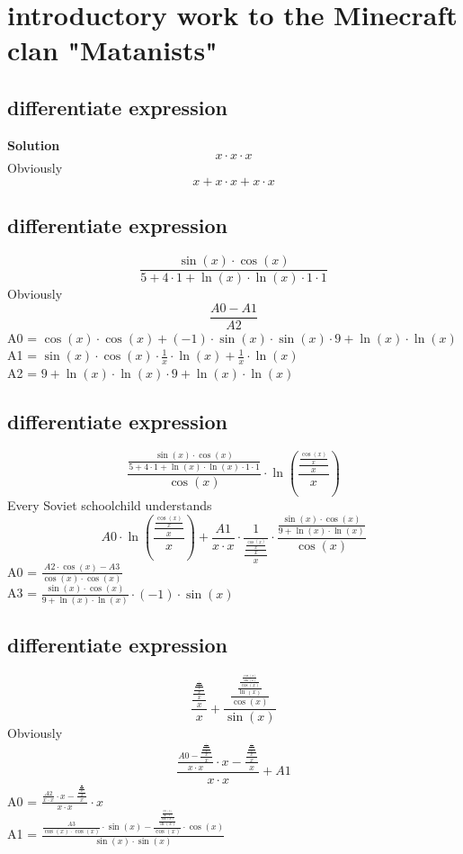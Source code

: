 \documentclass[12pt]{article}
\begin{document}
\section{introductory work to the Minecraft clan "Matanists"}
\subsection{differentiate expression}
\textbf{Solution}
$$x \cdot x \cdot x$$ 
Obviously \\ 
$$x + x \cdot x + x \cdot x$$ 
\subsection{differentiate expression}
$$\frac{\sin(x) \cdot \cos(x)}{5 + 4 \cdot 1 + \ln(x) \cdot \ln(x) \cdot 1 \cdot 1}$$ 
Obviously \\ 
$$\frac{A0 - A1}{A2}$$ 
A0 = $\cos(x) \cdot \cos(x) + (-1) \cdot \sin(x) \cdot \sin(x) \cdot 9 + \ln(x) \cdot \ln(x)$ \\ 
A1 = $\sin(x) \cdot \cos(x) \cdot \frac{1}{x} \cdot \ln(x) + \frac{1}{x} \cdot \ln(x)$ \\ 
A2 = $9 + \ln(x) \cdot \ln(x) \cdot 9 + \ln(x) \cdot \ln(x)$ \\ 
\subsection{differentiate expression}
$$\frac{\frac{\sin(x) \cdot \cos(x)}{5 + 4 \cdot 1 + \ln(x) \cdot \ln(x) \cdot 1 \cdot 1}}{\cos(x)} \cdot \ln(\frac{\frac{\frac{\cos(x)}{x}}{x}}{x})$$ 
Every Soviet schoolchild understands \\ 
$$A0 \cdot \ln(\frac{\frac{\frac{\cos(x)}{x}}{x}}{x}) + \frac{A1}{x \cdot x} \cdot \frac{1}{\frac{\frac{\frac{\cos(x)}{x}}{x}}{x}} \cdot \frac{\frac{\sin(x) \cdot \cos(x)}{9 + \ln(x) \cdot \ln(x)}}{\cos(x)}$$ 
A0 = $\frac{A2 \cdot \cos(x) - A3}{\cos(x) \cdot \cos(x)}$ \\ 
A3 = $\frac{\sin(x) \cdot \cos(x)}{9 + \ln(x) \cdot \ln(x)} \cdot (-1) \cdot \sin(x)$ \\ 
\subsection{differentiate expression}
$$\frac{\frac{\frac{\frac{\frac{\frac{\frac{\frac{\frac{x}{x}}{x}}{x}}{x}}{x}}{x}}{x}}{x}}{x} + \frac{\frac{\frac{\frac{\frac{\cos(x)}{\sin(x)}}{\cos(x)}}{\ln(x)}}{\cos(x)}}{\sin(x)}$$ 
Obviously \\ 
$$\frac{\frac{A0 - \frac{\frac{\frac{\frac{\frac{\frac{\frac{x}{x}}{x}}{x}}{x}}{x}}{x}}{x}}{x \cdot x} \cdot x - \frac{\frac{\frac{\frac{\frac{\frac{\frac{\frac{x}{x}}{x}}{x}}{x}}{x}}{x}}{x}}{x}}{x \cdot x} + A1$$ 
A0 = $\frac{\frac{A2}{x \cdot x} \cdot x - \frac{\frac{\frac{\frac{\frac{\frac{x}{x}}{x}}{x}}{x}}{x}}{x}}{x \cdot x} \cdot x$ \\ 
A1 = $\frac{\frac{A3}{\cos(x) \cdot \cos(x)} \cdot \sin(x) - \frac{\frac{\frac{\frac{\cos(x)}{\sin(x)}}{\cos(x)}}{\ln(x)}}{\cos(x)} \cdot \cos(x)}{\sin(x) \cdot \sin(x)}$ \\ 
\end{document}
